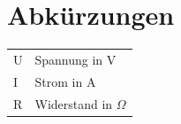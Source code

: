 {}
\chapter*{Abkürzungen}

\begin{tabular}{@{}ll}
    U & Spannung in V \\
    I & Strom in A \\
    R & Widerstand in $\Omega$ \\
\end{tabular}
